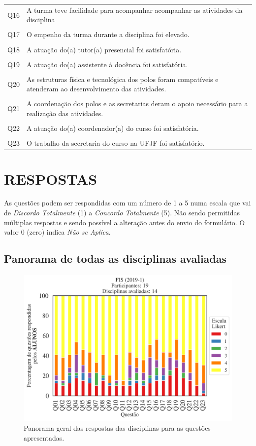 \documentclass[a4paper,10pt]{article}
\begin{document}
{\begin{center}
\begin{tabularx}{\linewidth}{c|X}
Q16&A turma teve facilidade para acompanhar acompanhar as atividades da disciplina\\\\
Q17&O empenho da turma durante a disciplina foi elevado.\\\\
Q18&A atuação do(a) tutor(a) presencial foi satisfatória.\\\\
Q19&A atuação do(a) assistente à docência foi satisfatória.\\\\
Q20&As estruturas física e tecnológica dos polos foram compatíveis e atenderam ao desenvolvimento das atividades.\\\\
Q21&A coordenação dos polos e as secretarias deram o apoio necessário para a realização das atividades.\\\\
Q22&A atuação do(a) coordenador(a) do curso foi satisfatória.\\\\
Q23&O trabalho da secretaria do curso na UFJF foi satisfatório.
\end{tabularx}
\end{center}
}
\section{RESPOSTAS}
As questões podem ser respondidas com um número de 1 a 5 numa escala que vai de {\it Discordo Totalmente} (1) a {\it Concordo Totalmente} (5). Não sendo permitidas múltiplas respostas e sendo possível a alteração antes do envio do formulário. O valor 0 (zero) indica {\it Não se Aplica}.

\subsection{Panorama de todas as disciplinas avaliadas}
\begin{figure}[h]
\centering
\includegraphics[width=0.85\linewidth]{analise_geral_departamento_FIS_ALUNO_TURMA.png}
\caption{\label{fig:analise_geral_departamento}            Panorama geral das respostas das disciplinas para as questões apresentadas.}
\end{figure}
\end{document}

